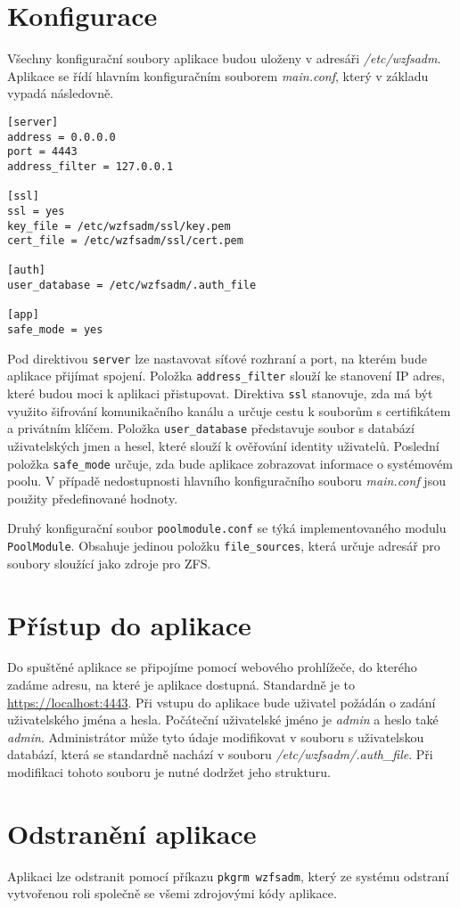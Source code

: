 \section{Konfigurace}
Všechny konfigurační soubory aplikace budou uloženy v adresáři \emph{/etc/wzfsadm}. Aplikace se řídí hlavním konfiguračním souborem \emph{main.conf}, který v základu vypadá následovně.
\begin{verbatim}
[server]
address = 0.0.0.0
port = 4443
address_filter = 127.0.0.1

[ssl]
ssl = yes
key_file = /etc/wzfsadm/ssl/key.pem
cert_file = /etc/wzfsadm/ssl/cert.pem

[auth]
user_database = /etc/wzfsadm/.auth_file

[app]
safe_mode = yes
\end{verbatim}
Pod direktivou \verb|server| lze nastavovat síťové rozhraní a port, na kterém bude aplikace přijímat spojení. Položka \verb|address_filter| slouží ke stanovení IP adres, které budou moci k aplikaci přistupovat. Direktiva \verb|ssl| stanovuje, zda má být využito šifrování komunikačního kanálu a určuje cestu k souborům s certifikátem a privátním klíčem. Položka \verb|user_database| představuje soubor s databází uživatelských jmen a hesel, které slouží k ověřování identity uživatelů. Poslední položka \verb|safe_mode| určuje, zda bude aplikace zobrazovat informace o systémovém poolu. V případě nedostupnosti hlavního konfiguračního souboru \emph{main.conf} jsou použity předefinované hodnoty.

Druhý konfigurační soubor \verb|poolmodule.conf| se týká implementovaného modulu \verb|PoolModule|. Obsahuje jedinou položku \verb|file_sources|, která určuje adresář pro soubory sloužící jako zdroje pro ZFS.

\section{Přístup do aplikace}
Do spuštěné aplikace se připojíme pomocí webového prohlížeče, do kterého zadáme adresu, na které je aplikace dostupná. Standardně je to \url{https://localhost:4443}. Při vstupu do aplikace bude uživatel požádán o zadání uživatelského jména a hesla. Počáteční uživatelské jméno je \emph{admin} a heslo také \emph{admin}. Administrátor může tyto údaje modifikovat v souboru s uživatelskou databází, která se standardně nachází v souboru \emph{/etc/wzfsadm/.auth\_file}. Při modifikaci tohoto souboru je nutné dodržet jeho strukturu.

\section{Odstranění aplikace}
Aplikaci lze odstranit pomocí příkazu \verb|pkgrm wzfsadm|, který ze systému odstraní vytvořenou roli společně se všemi zdrojovými kódy aplikace. 